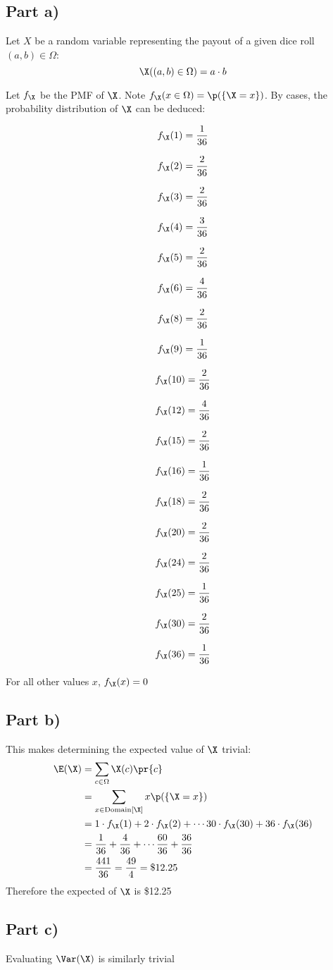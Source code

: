 \subsection{Part a)}

Let $X$ be a random variable representing the payout of a given dice roll $(a,b)\in \Omega$:
\[
\X ((a,b) \in \Omega) = a \cdot b
\]


Let $f_{\X}$ be the PMF of $\X$. Note $f_{\X}(x \in \Omega) = \p (\{ \X = x \})$. By cases, the probability distribution of $\X$ can be deduced:
\newcommand{\pq}[2]{
	\[f_{\X}(#1) = \frac{#2}{36}\]
}

\begin{multicols}{3}

\pq{1}{1}
\pq{2}{2}
\pq{3}{2}
\pq{4}{3}
\pq{5}{2}
\pq{6}{4}
\pq{8}{2}
\pq{9}{1}
\pq{10}{2}
\pq{12}{4}
\pq{15}{2}
\pq{16}{1}
\pq{18}{2}
\pq{20}{2}
\pq{24}{2}
\pq{25}{1}
\pq{30}{2}
\pq{36}{1}

\end{multicols}

For all other values $x$, $f_{\X}(x) = 0$

\subsection{Part b)}

This makes determining the expected value of $\X$ trivial:
\begin{align*}
\E (\X) &= \sum _{c \in \Omega} \X (c) \pr{c} \\
&= \sum _{x \in \mathrm{Domain}[\X]} x \p (\{ \X = x\}) \\
&= 1 \cdot f_{\X} (1) + 2 \cdot f_{\X}(2) + \cdots 30 \cdot f_{\X}(30) + 36 \cdot f_{\X}(36) \\
&= \frac{1}{36} + \frac{4}{36} + \cdots \frac{60}{36} + \frac{36}{36} \\
&= \frac{441}{36} = \frac{49}{4} = \$12.25
\end{align*}
Therefore the expected of $\X$ is \$12.25

\subsection{Part c)}

Evaluating $\Var(\X)$ is similarly trivial

